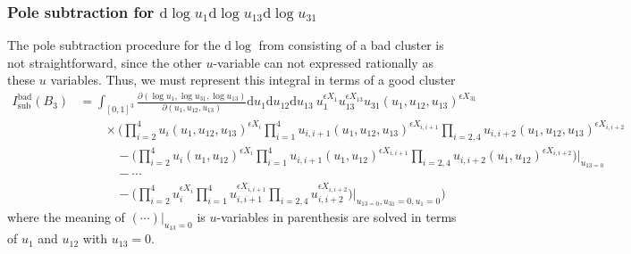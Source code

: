 \documentclass[12pt]{article}
\theoremstyle{definition}
\theoremstyle{plain}
\newcommand{\dif}{\mathrm{d}} %
\begin{document}
\subsubsection*{Pole subtraction for $\dif \log u_{1}\dif\log u_{13}\dif \log u_{31}$} 

The pole subtraction procedure for the $\dif\log$ from consisting of a bad cluster is not straightforward, since the other $u$-variable can not expressed rationally as these $u$ variables. Thus, we must represent this integral in terms of a good cluster
\begin{align}
    I_{\text{sub}}^{\text{bad}}(B_{3})&=\int_{[0,1]^{3}}\frac{\partial(\log u_{1},\log u_{31},\log u_{13})}{\partial(u_{1},u_{12},u_{13})}\dif u_{1}\dif u_{12}\dif u_{13}\:u_{1}^{\epsilon X_{1}}u_{13}^{\epsilon X_{13}} u_{31}(u_{1},u_{12},u_{13})^{\epsilon X_{31}} \nonumber \\
    &\qquad \times \Biggl(\prod_{i=2}^{4} u_{i}(u_{1},u_{12},u_{13})^{\epsilon X_{i}}\prod_{i=1}^{4} u_{i,i+1}(u_{1},u_{12},u_{13})^{\epsilon X_{i,i+1}}\prod_{i=2,4} u_{i,i+2}(u_{1},u_{12},u_{13})^{\epsilon X_{i,i+2}} \nonumber \\
    &\qquad \quad -\biggl(\prod_{i=2}^{4} u_{i}(u_{1},u_{12})^{\epsilon X_{i}}\prod_{i=1}^{4} u_{i,i+1}(u_{1},u_{12})^{\epsilon X_{i,i+1}}
    \prod_{i=2,4} u_{i,i+2}(u_{1},u_{12})^{\epsilon X_{i,i+2}}\biggr)\bigg\vert_{u_{13=0}}  \nonumber \\
    &\qquad\quad  -\cdots  \nonumber \\
    &\qquad \quad -\biggl(\prod_{i=2}^{4} u_{i}^{\epsilon X_{i}}\prod_{i=1}^{4} u_{i,i+1}^{\epsilon X_{i,i+1}}
    \prod_{i=2,4} u_{i,i+2}^{\epsilon X_{i,i+2}}\biggr)\bigg\vert_{u_{13=0},u_{31}=0,u_{1}=0} 
    \Biggr)
\end{align}
where the meaning of $(\cdots)\vert_{u_{13}=0}$ is $u$-variables in parenthesis are solved in terms of $u_{1}$ and $u_{12}$ with $u_{13}=0$.

\iffalse
\end{document}
